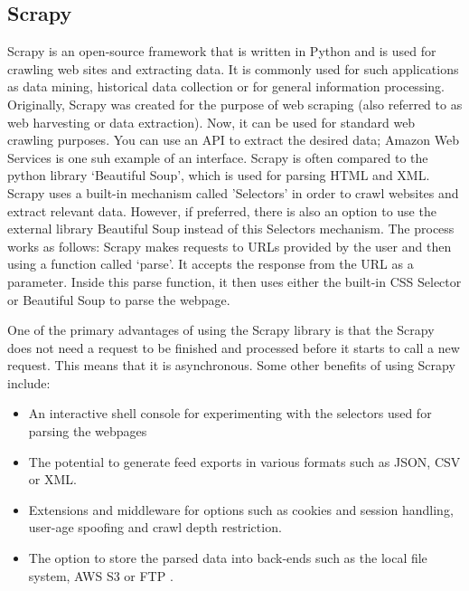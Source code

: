 \subsection{Scrapy}
Scrapy is an open-source framework that is written in Python and is used for crawling web sites and extracting data. It is commonly used for such applications as data mining, historical data collection or for general information processing. Originally, Scrapy was created for the purpose of web scraping (also referred to as web harvesting or data extraction). Now, it can be used for standard web crawling purposes. You can use an API to extract the desired data; Amazon Web Services is one suh example of an interface. Scrapy is often compared to the python library ‘Beautiful Soup’, which is used for parsing HTML and XML. Scrapy uses a built-in mechanism called 'Selectors' in order to crawl websites and extract relevant data.  However, if preferred, there is also an option to use the external library Beautiful Soup instead of this Selectors mechanism. 
The process works as follows: Scrapy makes requests to URLs provided by the user and then using a function called ‘parse’. It accepts the response from the URL as a parameter. Inside this parse function, it then uses either the built-in CSS Selector or Beautiful Soup to parse the webpage.

One of the primary advantages of using the Scrapy library is that the Scrapy does not need a request to be finished and processed before it starts to call a new request. This means that it is asynchronous.
Some other benefits of using Scrapy include:
\begin{itemize}
	\item An interactive shell console for experimenting with the selectors used for parsing the webpages
	\item The potential to generate feed exports in various formats such as JSON, CSV or XML.
	\item Extensions and middleware for options such as cookies and session handling, user-age spoofing and crawl depth restriction.
	\item The option to store the parsed data into back-ends such as the local file system, AWS S3 or FTP \cite{scrapy}.
\end{itemize}

